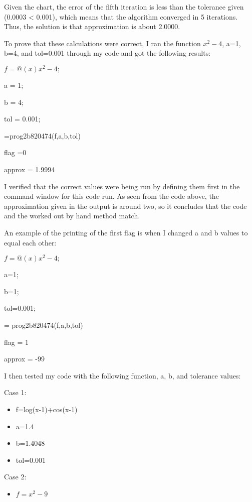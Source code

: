 \documentclass{article}
\begin{document}
{\color{black} Given the chart, the error of the fifth iteration is less than the tolerance given (0.0003 < 0.001), which means that the algorithm converged in 5 iterations.  Thus, the solution is that approximation is about 2.0000.  
\par \medskip
To prove that these calculations were correct, I ran the function $x^2-4$, a=1, b=4, and tol=0.001 through my code and got the following results:
\par \medskip
$f  = @(x) x^2-4;$
\par \medskip
a = 1;
\par \medskip
b = 4;
\par \medskip
tol = 0.001;
\par {}=prog2b820474(f,a,b,tol)
\par \medskip
flag =0
\par \medskip
approx = 1.9994
\par \medskip
I verified that the correct values were being run by defining them first in the command window for this code run.  As seen from the code above, the approximation given in the output is around two, so it concludes that the code and the worked out by hand method match.
\par \medskip
An example of the printing of the first flag is when I changed a and b values to equal each other:
\par \medskip
$f = @(x) x^2-4;$
\par \medskip
a=1;
\par \medskip
b=1;
\par \medskip
tol=0.001;
\par {} = prog2b820474(f,a,b,tol)
\par \medskip
flag = 1
\par \medskip
approx = -99
\par \medskip
I then tested my code with the following function, a, b, and tolerance values:
\par \medskip
Case 1:
\begin{itemize}
    \item f=log(x-1)+cos(x-1)
    \item a=1.4
    \item b=1.4048
    \item tol=0.001
\end{itemize}
\par \medskip
Case 2:
\begin{itemize}
    \item $f=x^2-9$

\end{itemize}}
\end{document}
